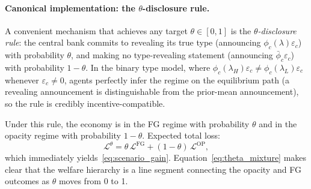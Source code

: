 \paragraph{Canonical implementation: the $\theta$-disclosure rule.}
A convenient mechanism that achieves any target $\theta \in [0,1]$ is the
\emph{$\theta$-disclosure rule}: the central bank commits to revealing its true
type (announcing $\phi_c(\lambda)\varepsilon_c$) with probability $\theta$, and
making no type-revealing statement (announcing $\bar{\phi}_c\varepsilon_c$) with
probability $1-\theta$. In the binary type model, where
$\phi_c(\lambda_H)\varepsilon_c \neq \phi_c(\lambda_L)\varepsilon_c$ whenever
$\varepsilon_c \neq 0$, agents perfectly infer the regime on the equilibrium path
(a revealing announcement is distinguishable from the prior-mean announcement), so
the rule is credibly incentive-compatible.

Under this rule, the economy is in the FG regime with probability $\theta$ and in
the opacity regime with probability $1-\theta$. Expected total loss:
\begin{equation}
  \mathcal{L}^\theta
  = \theta\,\mathcal{L}^{\mathrm{FG}} + (1-\theta)\,\mathcal{L}^{\mathrm{OP}},
  \label{eq:theta_mixture}
\end{equation}
which immediately yields~\eqref{eq:scenario_gain}. Equation~\eqref{eq:theta_mixture}
makes clear that the welfare hierarchy is a line segment connecting the opacity and
FG outcomes as $\theta$ moves from 0 to 1.

